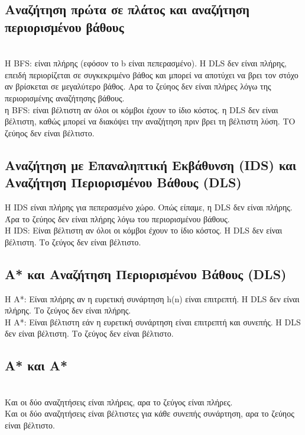 \documentclass[12pt]{article}
\newcommand{\la}{\latintext}
\begin{document}
\subsection{ Αναζήτηση πρώτα σε πλάτος και αναζήτηση περιορισμένου βάθους} \\
Η {\la BFS}: είναι πλήρης (εφόσον το {\la b} είναι πεπερασμένο). Η {\la DLS} δεν είναι πλήρης, επειδή περιορίζεται σε συγκεκριμένο βάθος και μπορεί να αποτύχει να βρει τον στόχο αν βρίσκεται σε μεγαλύτερο βάθος. Αρα το ζεύηος δεν είναι πλήρες λόγω της περιορισμένης αναζήτησης βάθους.  \\
η {\la BFS}: είναι βέλτιστη αν όλοι οι κόμβοι έχουν το ίδιο κόστος. η {\la DLS} δεν είναι βέλτιστη, καθώς μπορεί να διακόψει την αναζήτηση πριν βρει τη βέλτιστη λύση. ΤΟ ζεύηος δεν είναι βέλτιστο.

\subsection{ Αναζήτηση με Επαναληπτική Εκβάθυνση ({\la IDS}) και Αναζήτηση Περιορισμένου Βάθους (\la DLS)}
Η {\la IDS} είναι πλήρης για πεπερασμένο χώρο. Οπώς είπαμε, η {\la DLS} δεν είναι πλήρης. Άρα το ζεύηος δεν είναι πλήρης λόγω του περιορισμένου βάθους. \\
Η {\la IDS}: Είναι βέλτιστη αν όλοι οι κόμβοι έχουν το ίδιο κόστος. Η {\la DLS} δεν είναι βέλτιστη. Το ζεύγος δεν είναι βέλτιστο.

\subsection{ Α* και Αναζήτηση Περιορισμένου Βάθους (\la DLS)}
Η Α*: Είναι πλήρης αν η ευρετική συνάρτηση {\la h(n)} είναι επιτρεπτή. Η {\la DLS} δεν είναι πλήρης. Το ζεύγος δεν είναι πλήρης. \\ 
Η A*: Είναι βέλτιστη εάν η ευρετική συνάρτηση είναι επιτρεπτή και συνεπής. Η {\la DLS} δεν είναι βέλτιστη. Το ζεύγος δεν είναι βέλτιστο.
\subsection{ Α* και Α*} \\
Και οι δύο αναζητήσεις είναι πλήρεις, αρα το ζεύγος είναι πλήρες. \\
Και οι δύο αναζητήσεις είναι βέλτιστες για κάθε συνεπής συνάρτηση, αρα το ζεύηος είναι βέλτιστο. 
\end{document}
